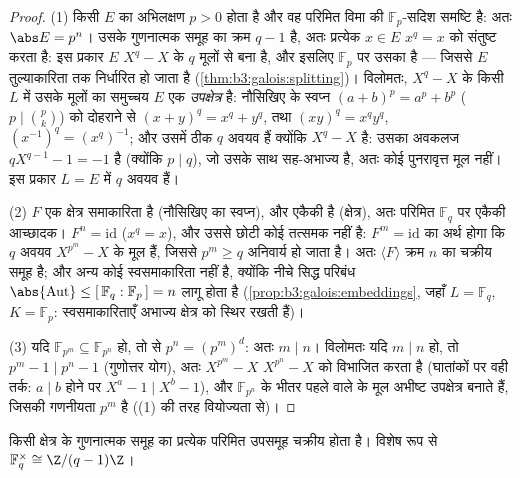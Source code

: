 \begin{proof}
(1) किसी  $E$ का अभिलक्षण $p > 0$ होता है और वह
परिमित विमा की $\mathbb F_p$-सदिश समष्टि है: अतः $\abs E = p^n$। उसके गुणनात्मक
समूह का क्रम $q - 1$ है, अतः प्रत्येक $x \in E$ $x^q = x$ को संतुष्ट करता
है: इस प्रकार $E$ $X^q - X$ के $q$ मूलों से बना है, और इसलिए
$\mathbb F_p$ पर उसका  है --- जिससे $E$ तुल्याकारिता तक
निर्धारित हो जाता है (\cref{thm:b3:galois:splitting})। विलोमतः, $X^q - X$ के किसी  $L$ में उसके मूलों का समुच्चय $E$ एक
\emph{उपक्षेत्र} है: नौसिखिए के स्वप्न $(a+b)^p = a^p + b^p$ ($p \mid \binom pk$) को दोहराने
से $(x + y)^q = x^q + y^q$, तथा $(xy)^q = x^qy^q$, $(x^{-1})^q = (x^q)^{-1}$; और उसमें ठीक $q$ अवयव हैं क्योंकि
$X^q - X$  है: उसका अवकलज $qX^{q-1} - 1 = -1$ है (क्योंकि $p \mid q$), जो उसके
साथ सह-अभाज्य है, अतः कोई पुनरावृत्त मूल नहीं। इस प्रकार $L = E$
में $q$ अवयव हैं।

(2) $F$ एक क्षेत्र समाकारिता है (नौसिखिए का स्वप्न), और एकैकी
है (क्षेत्र), अतः परिमित $\mathbb F_q$ पर एकैकी आच्छादक। $F^n =
\mathrm{id}$ ($x^q = x$),
और उससे छोटी कोई  तत्समक नहीं है: $F^m = \mathrm{id}$ का अर्थ होगा कि
$q$ अवयव $X^{p^m} - X$ के मूल हैं, जिससे $p^m \geq q$ अनिवार्य हो जाता है।
अतः $\langle F\rangle$ क्रम $n$ का चक्रीय समूह है; और अन्य कोई स्वसमाकारिता
नहीं है, क्योंकि नीचे सिद्ध परिबंध $\abs{\operatorname{Aut}} \leq [\,\mathbb F_q :
\mathbb F_p\,] = n$ लागू होता है (\cref{prop:b3:galois:embeddings},
जहाँ $L = \mathbb F_q$, $K =
\mathbb F_p$: स्वसमाकारिताएँ अभाज्य क्षेत्र को स्थिर रखती
हैं)।

(3) यदि $\mathbb F_{p^m} \subseteq \mathbb F_{p^n}$ हो, तो  से $p^n = (p^m)^d$: अतः $m \mid n$। विलोमतः यदि
$m \mid n$ हो, तो $p^m - 1 \mid p^n - 1$ (गुणोत्तर योग), अतः $X^{p^m} - X$ $X^{p^n} - X$ को विभाजित
करता है (घातांकों पर वही तर्क: $a \mid b$ होने पर $X^{a} - 1 \mid X^{b}
- 1$), और $\mathbb F_{p^n}$ के
भीतर पहले वाले के मूल अभीष्ट उपक्षेत्र बनाते हैं, जिसकी गणनीयता
$p^m$ है ((1) की तरह वियोज्यता से)।
\end{proof}

\begin{theorem}[चक्रीयता]\label{thm:b3:galois:cyclic}
किसी क्षेत्र के गुणनात्मक समूह का प्रत्येक परिमित उपसमूह चक्रीय
होता है। विशेष रूप से $\mathbb F_q^\times \cong
\Z/(q-1)\Z$।
\end{theorem}

